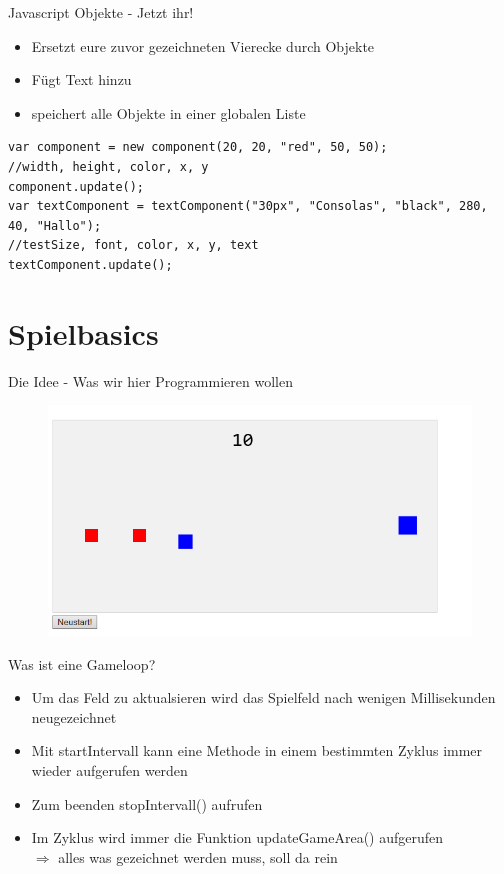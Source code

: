 \documentclass[18pt]{beamer}
\begin{document}
\begin{frame}[fragile]{Javascript Objekte - Jetzt ihr!}
\begin{itemize}
	\item Ersetzt eure zuvor gezeichneten Vierecke durch Objekte
	\item Fügt Text hinzu
	\item speichert alle Objekte in einer globalen Liste
	

\end{itemize}
\begin{lstlisting}
var component = new component(20, 20, "red", 50, 50);
//width, height, color, x, y
component.update();
var textComponent = textComponent("30px", "Consolas", "black", 280, 40, "Hallo");
//testSize, font, color, x, y, text
textComponent.update();
\end{lstlisting}
\end{frame}



\section{Spielbasics}

\begin{frame}{Die Idee - Was wir hier Programmieren wollen}
\begin{figure}[htb]
	\centering
	\includegraphics[width=1\textwidth]{logos/game}
\end{figure}
\end{frame}

\begin{frame}{Was ist eine Gameloop?}
\begin{itemize}
	\item Um das Feld zu aktualsieren wird das Spielfeld nach wenigen Millisekunden neugezeichnet
	\item Mit startIntervall kann eine Methode in einem bestimmten Zyklus immer wieder aufgerufen werden 
	\item Zum beenden stopIntervall() aufrufen
	\item Im Zyklus wird immer die Funktion updateGameArea() aufgerufen\\ \( \Rightarrow \) alles was gezeichnet werden muss, soll da rein
\end{itemize}
\end{frame}
\end{document}
